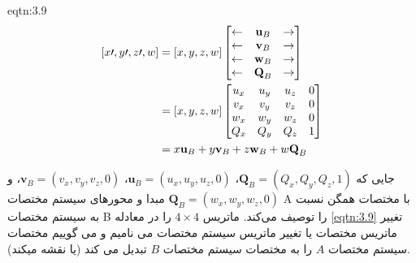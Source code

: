 {\begin{spacing}{1.5}
        \begin{eqtn}{eqtn:3.9}
            \begin{equation*}
                \centering
                \begin{split}
                [x\prime,y\prime,z\prime,w]
                    &=[x,y,z,w]\begin{bmatrix}
                                   \leftarrow & \textbf{u}_{B} & \rightarrow \\
                                   \leftarrow & \textbf{v}_{B} & \rightarrow \\
                                   \leftarrow & \textbf{w}_{B} & \rightarrow \\
                                   \leftarrow & \textbf{Q}_{B} & \rightarrow
                    \end{bmatrix} \\
                    &=[x,y,z,w]\begin{bmatrix}
                                   u_{x} & u_{y} & u_{z} & 0 \\
                                   v_{x} & v_{y} & v_{z} & 0 \\
                                   w_{x} & w_{y} & w_{z} & 0 \\
                                   Q_{x} & Q_{y} & Q_{z} & 1
                    \end{bmatrix} \\
                    &=x\textbf{u}_{B}+y\textbf{v}_{B}+z\textbf{w}_{B}+w\textbf{Q}_{B}
                \end{split}
            \end{equation*}
            \centering
        \end{eqtn}

        جایی که $\textbf{Q}_{B}=(Q_{x}, Q_{y}, Q_{z}, 1)$، $\textbf{u}_{B}=(u_{x}, u_{y}, u_{z}, 0)$، $\textbf{v}_{B}=(v_{x}, v_{y}, v_{z}, 0)$، و $\textbf{Q}_{B}=(w_{x}, w_{y}, w_{z}, 0)$ مبدا و محورهای سیستم مختصات A با مختصات همگن نسبت به سیستم مختصات B را توصیف می‌کند.
        ماتریس $4\times 4$ را در معادله \ref{eqtn:3.9} تغییر ماتریس مختصات یا تغییر ماتریس سیستم مختصات می نامیم و می گوییم مختصات سیستم مختصات $A$ را به مختصات سیستم مختصات $B$ تبدیل می کند (یا نقشه میکند).
    \end{spacing}
}

